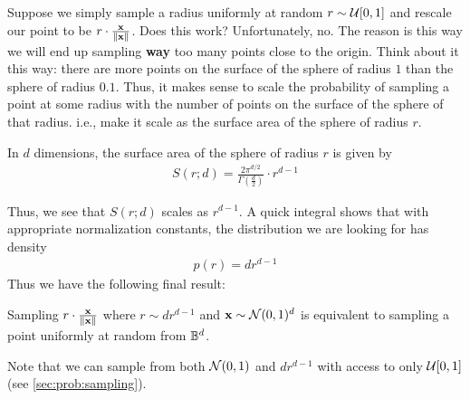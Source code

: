     Suppose we simply sample a radius uniformly at random $r \sim \mathcal{U}[0,1]$ and rescale our point to be $r \cdot \frac{{\bf x}}{\lVert {\bf x} \rVert}$. Does this work? Unfortunately, no. The reason is this way we will end up sampling \textbf{way} too many points close to the origin. Think about it this way: there are more points on the surface of the sphere of radius $1$ than the sphere of radius $0.1$. Thus, it makes sense to scale the probability of sampling a point at some radius with the number of points on the surface of the sphere of that radius. i.e., make it scale as the surface area of the sphere of radius $r$.
    
    \begin{theorem}
    In $d$ dimensions, the surface area of the sphere of radius $r$ is given by
    \begin{align*}
        S(r; d) = \frac{2\pi^{d/2}}{\Gamma\left(\frac{d}{2}\right)} \cdot r^{d-1}
    \end{align*}
    \end{theorem}
    Thus, we see that $S(r; d)$ scales as $r^{d-1}$. A quick integral shows that with appropriate normalization constants, the distribution we are looking for has density
    \begin{align*}
        p(r) = dr^{d-1}
    \end{align*}
    Thus we have the following final result:
    \begin{theorem}
    Sampling $r \cdot \frac{\mathbf{x}}{\lVert \mathbf{x} \rVert}$ where $r \sim dr^{d-1}$ and $\mathbf{x} \sim \mathcal{N}(0,1)^d$ is equivalent to sampling a point uniformly at random from $\mathbb{B}^d$.
    \end{theorem}
    Note that we can sample from both $\mathcal{N}(0,1)$ and $dr^{d-1}$ with access to only $\mathcal{U}[0,1]$ (see \autoref{sec:prob:sampling}).
    
